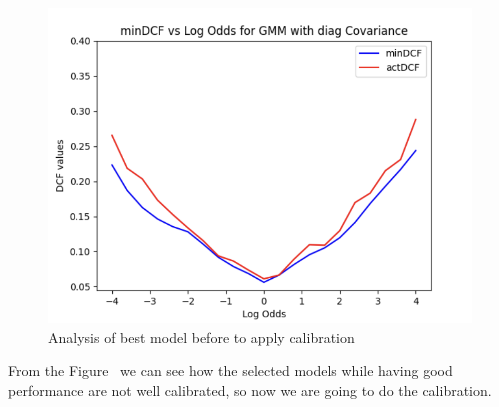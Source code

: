 \documentclass{article}
\begin{document}
\begin{figure}[H]
\begin{minipage}{.3\textwidth}
        \includegraphics[width=\linewidth]{./img/BestGMM.png}
    \end{minipage}
    \caption{Analysis of best model before to apply calibration} %
    \label{fig:CalAnal} %
\end{figure}
From the Figure~ we can see how the selected models while having good performance are not well calibrated, so now we are going to do the calibration.
\end{document}
